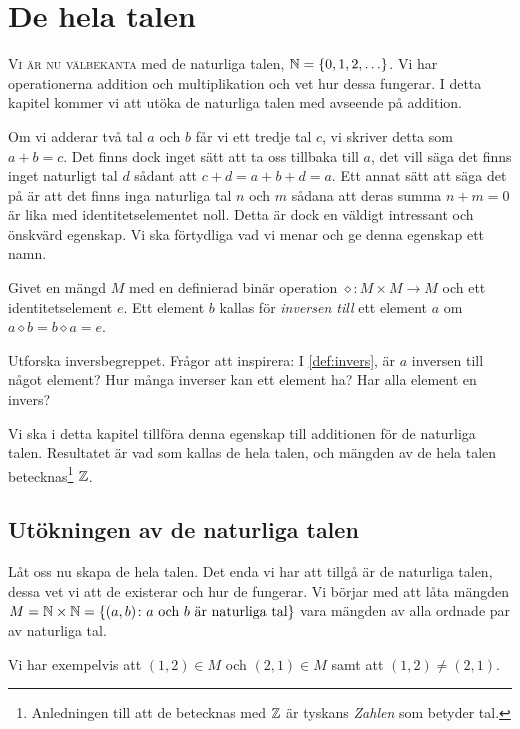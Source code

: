 \chapter{De hela talen}
\label{ch:Heltalen}
\lettrine{V}{i är nu välbekanta} med de naturliga talen,
\(\mathbb{N}=\{0,1,2,\ldots\}\).
Vi har operationerna addition och multiplikation och vet hur dessa fungerar.
I detta kapitel kommer vi att utöka de naturliga talen med avseende på
addition.

Om vi adderar två tal \(a\) och \(b\) får vi ett tredje tal \(c\), vi skriver
detta som \(a+b=c\).
Det finns dock inget sätt att ta oss tillbaka till \(a\), det vill säga det
finns inget naturligt tal \(d\) sådant att \(c+d=a+b+d=a\).
Ett annat sätt att säga det på är att det finns inga naturliga tal \(n\) och
\(m\) sådana att deras summa \(n+m=0\) är lika med identitetselementet noll.
Detta är dock en väldigt intressant och önskvärd egenskap.
Vi ska förtydliga vad vi menar och ge denna egenskap ett namn.
\begin{definition}\label{def:invers}
  Givet en mängd \(M\) med en definierad binär operation \(\diamond\colon 
  M\times M\to M\) och ett identitetselement \(e\).
  Ett element \(b\) kallas för \emph{inversen till} ett element \(a\) om
  \(a\diamond b = b\diamond a = e\).
\end{definition}
\begin{exercise}
  Utforska inversbegreppet.
  Frågor att inspirera:
  I \cref{def:invers}, är \(a\) inversen till något element?
  Hur många inverser kan ett element ha?
  Har alla element en invers?
\end{exercise}

Vi ska i detta kapitel tillföra denna egenskap till additionen för de naturliga
talen.
Resultatet är vad som kallas de hela talen, och mängden av de hela talen
betecknas\footnote{Anledningen till att de betecknas med \(\mathbb{Z}\) är tyskans
\emph{Zahlen} som betyder tal.} \(\mathbb{Z}\).


\section{Utökningen av de naturliga talen}
\label{sec:HeltalensKonstruktion}
Låt oss nu skapa de hela talen.
Det enda vi har att tillgå är de naturliga talen, dessa vet vi att de
existerar och hur de fungerar.
Vi börjar med att låta mängden \(M = \mathbb{N}\times\mathbb{N} =
\{(a,b)\colon a\text{ och }b\text{ är naturliga tal}\}\) vara mängden av alla
ordnade par av naturliga tal.
\begin{example}
  Vi har exempelvis att \((1,2)\in M\) och \((2,1)\in M\) samt att
  \((1,2)\neq (2,1)\).
\end{example}

